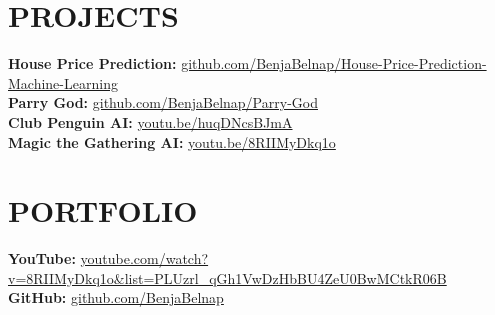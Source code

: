 \documentclass[11pt]{article}
\begin{document}
\section*{{\color{accent}PROJECTS}}

\textbf{House Price Prediction:} \href{https://github.com/BenjaBelnap/House-Price-Prediction-Machine-Learning}{github.com/BenjaBelnap/House-Price-Prediction-Machine-Learning}\\
\textbf{Parry God:} \href{https://github.com/BenjaBelnap/Parry-God}{github.com/BenjaBelnap/Parry-God}\\
\textbf{Club Penguin AI:} \href{https://youtu.be/huqDNcsBJmA?si=JeCqGqGiTHdY9so1}{youtu.be/huqDNcsBJmA}\\
\textbf{Magic the Gathering AI:} \href{https://youtu.be/8RIIMyDkq1o?si=IFQelgHKwUcTemNc}{youtu.be/8RIIMyDkq1o}

\section*{{\color{accent}PORTFOLIO}}

\textbf{YouTube:} \href{https://www.youtube.com/watch?v=8RIIMyDkq1o&list=PLUzrl_qGh1VwDzHbBU4ZeU0BwMCtkR06B}{youtube.com/watch?v=8RIIMyDkq1o\&list=PLUzrl\_qGh1VwDzHbBU4ZeU0BwMCtkR06B}\\
\textbf{GitHub:} \href{https://github.com/BenjaBelnap}{github.com/BenjaBelnap}
\end{document}
